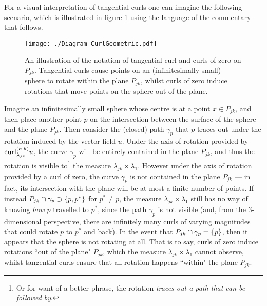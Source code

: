 For a visual interpretation of tangential curls one can imagine the following scenario, which is illustrated in figure \ref{fig:Diagram_CurlGeometric} using the language of the commentary that follows.
\begin{figure}[t!]
	\centering
	\texttt{[image: ./Diagram\_CurlGeometric.pdf]}
	\caption[Geometric interpretation of tangential curls with respect to $\dddmes$.]{\label{fig:Diagram_CurlGeometric} An illustration of the notation of tangential curl and curls of zero on $P_{jk}$. Tangential curls cause points on an (infinitesimally small) sphere to rotate within the plane $P_{jk}$, whilst curls of zero induce rotations that move points on the sphere out of the plane.}
\end{figure}
Imagine an infinitesimally small sphere whose centre is at a point $x\in P_{jk}$, and then place another point $p$ on the intersection between the surface of the sphere and the plane $P_{jk}$.
Then consider the (closed) path $\gamma_p$ that $p$ traces out under the rotation induced by the vector field $u$.
Under the axis of rotation provided by $\mathrm{curl}_{\lambda_{jk}}^{\left( \kappa, \theta \right)}u$, the curve $\gamma_p$ will be entirely contained in the plane $P_{jk}$, and thus the rotation is visible to\footnote{Or for want of a better phrase, the rotation \emph{traces out a path that can be followed by}.} the measure $\lambda_{jk}\times\lambda_1$.
However under the axis of rotation provided by a curl of zero, the curve $\gamma_p$ is not contained in the plane $P_{jk}$ --- in fact, its intersection with the plane will be at most a finite number of points.
If instead $P_{jk}\cap\gamma_p\supset\left\{ p,p^* \right\}$ for $p^*\neq p$, the measure $\lambda_{jk}\times\lambda_1$ still has no way of knowing \emph{how} $p$ travelled to $p^*$, since the path $\gamma_p$ is not visible (and, from the 3-dimensional perspective, there are infinitely many curls of varying magnitudes that could rotate $p$ to $p^*$ and back).
In the event that $P_{jk}\cap\gamma_p=\left\{ p \right\}$, then it appears that the sphere is not rotating at all.
That is to say, curls of zero induce rotations ``out of the plane" $P_{jk}$, which the measure $\lambda_{jk}\times\lambda_1$ cannot observe, whilst tangential curls ensure that all rotation happens ``within" the plane $P_{jk}$.

